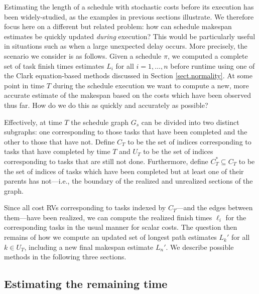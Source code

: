 \documentclass[12pt]{article}
\begin{document}
Estimating the length of a schedule with stochastic costs before its execution has been widely-studied, as the examples in previous sections illustrate. We therefore focus here on a different but related problem: how can schedule makespan estimates be quickly updated {\em during} execution? This would be particularly useful in situations such as when a large unexpected delay occurs. More precisely, the scenario we consider is as follows. Given a schedule $\pi$, we computed a complete set of task finish times estimates $L_i$ for all $i = 1, \dots, n$ before runtime using one of the Clark equation-based methods discussed in Section \ref{sect.normality}. At some point in time $T$ during the schedule execution we want to compute a new, more accurate estimate of the makespan based on the costs which have been observed thus far. How do we do this as quickly and accurately as possible?

Effectively, at time $T$ the schedule graph $G_s$ can be divided into two distinct subgraphs: one corresponding to those tasks that have been completed and the other to those that have not. Define $C_T$ to be the set of indices corresponding to tasks that have completed by time $T$ and $U_T$ to be the set of indices corresponding to tasks that are still not done. Furthermore, define $C_T^* \subseteq C_T$ to be the set of indices of tasks which have been completed but at least one of their parents has not---i.e., the boundary of the realized and unrealized sections of the graph.

Since all cost RVs corresponding to tasks indexed by $C_T$---and the edges between them---have been realized, we can compute the realized finish times $\ell_i$ for the corresponding tasks in the usual manner for scalar costs. The question then remains of how we compute an updated set of longest path estimates $L_k'$ for all $k \in U_T$, including a new final makespan estimate $L_n'$. We describe possible methods in the following three sections.

\subsection{Estimating the remaining time}
\label{subsect.remaining}
\end{document}

